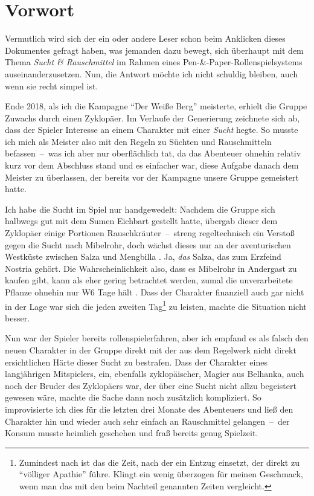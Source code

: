\chapter*{Vorwort}
Vermutlich wird sich der ein oder andere Leser schon beim Anklicken dieses Dokumentes gefragt haben, was jemanden dazu bewegt, sich überhaupt mit dem Thema \emph{Sucht \& Rauschmittel} im Rahmen eines Pen-\&-Paper-Rollenspielsystems auseinanderzusetzen. Nun, die Antwort möchte ich nicht schuldig bleiben, auch wenn sie recht simpel ist.

Ende 2018, als ich die Kampagne \enquote{Der Weiße Berg} \cite{WB1,WB2} meisterte, erhielt die Gruppe Zuwachs durch einen Zyklopäer. Im Verlaufe der Generierung zeichnete sich ab, dass der Spieler Interesse an einem Charakter mit einer \emph{Sucht} hegte. So musste ich mich als Meister also mit den Regeln zu Süchten und Rauschmitteln befassen~--~was ich aber nur oberflächlich tat, da das Abenteuer ohnehin relativ kurz vor dem Abschluss stand und es einfacher war, diese Aufgabe danach dem Meister zu überlassen, der bereits vor der Kampagne unsere Gruppe gemeistert hatte.

Ich habe die Sucht im Spiel nur handgewedelt: Nachdem die Gruppe sich halbwegs gut mit dem Sumen Eichbart gestellt hatte, übergab dieser dem Zyklopäer einige Portionen Rauschkräuter~--~streng regeltechnisch ein Verstoß gegen die Sucht nach Mibelrohr, doch wächst dieses nur an der aventurischen Westküste zwischen Salza und Mengbilla \cite[S.~251]{ZBA}. Ja, \emph{das} Salza, das zum Erzfeind Nostria gehört. Die Wahrscheinlichkeit also, dass es Mibelrohr in Andergast zu kaufen gibt, kann als eher gering betrachtet werden, zumal die unverarbeitete Pflanze ohnehin nur W6 Tage hält \cite[S.~251]{ZBA}. Dass der Charakter finanziell auch gar nicht in der Lage war sich die  jeden zweiten Tag\footnote{Zumindest nach  ist das die Zeit, nach der ein Entzug einsetzt, der direkt zu \enquote{völliger Apathie} führe. Klingt ein wenig überzogen für meinen Geschmack, wenn man das mit den beim Nachteil genannten Zeiten vergleicht.} zu leisten, machte die Situation nicht besser.

Nun war der Spieler bereits rollenspielerfahren, aber ich empfand es als falsch den neuen Charakter in der Gruppe direkt mit der aus dem Regelwerk nicht direkt ersichtlichen Härte dieser Sucht zu bestrafen. Dass der Charakter eines langjährigen Mitspielers, ein, ebenfalls zyklopäischer, Magier aus Belhanka, auch noch der Bruder des Zyklopäers war, der über eine Sucht nicht allzu begeistert gewesen wäre, machte die Sache dann noch zusätzlich kompliziert. So improvisierte ich dies für die letzten drei Monate des Abenteuers und ließ den Charakter hin und wieder auch sehr einfach an Rauschmittel gelangen~--~der Konsum musste heimlich geschehen und fraß bereits genug Spielzeit.

